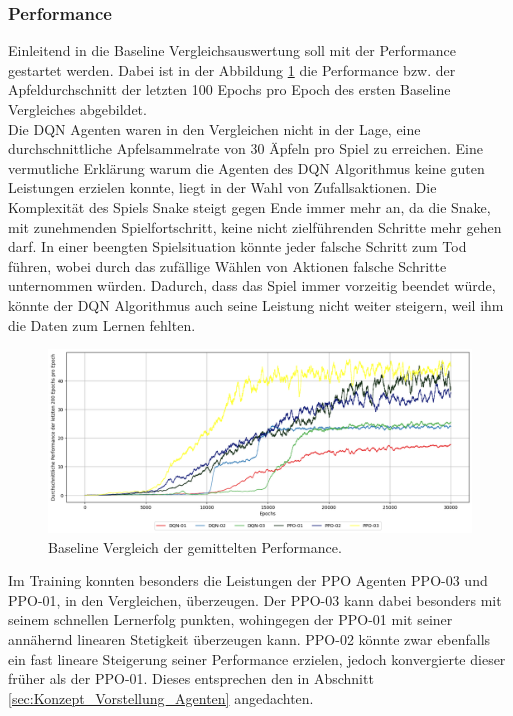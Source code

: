 \subsubsection{Performance}
Einleitend in die Baseline Vergleichsauswertung soll mit der Performance gestartet werden. Dabei ist in der Abbildung \ref{fig:Baseline_01_performance} die Performance bzw. der Apfeldurchschnitt der letzten 100 Epochs pro Epoch des ersten Baseline Vergleiches abgebildet.\\
Die DQN Agenten waren in den Vergleichen nicht in der Lage, eine durchschnittliche Apfelsammelrate von 30 Äpfeln pro Spiel zu erreichen. 
Eine vermutliche Erklärung warum die Agenten des DQN Algorithmus keine guten Leistungen erzielen konnte, liegt in der Wahl von Zufallsaktionen. Die Komplexität des Spiels Snake steigt gegen Ende immer mehr an, da die Snake, mit zunehmenden Spielfortschritt, keine nicht zielführenden Schritte mehr gehen darf. In einer beengten Spielsituation könnte jeder falsche Schritt zum Tod führen, wobei durch das zufällige Wählen von Aktionen falsche Schritte unternommen würden. Dadurch, dass das Spiel immer vorzeitig beendet würde, könnte der DQN Algorithmus auch seine Leistung nicht weiter steigern, weil ihm die Daten zum Lernen fehlten.
\begin{figure}[H]
	\centering
	\includegraphics[scale=0.4517]{Abbildungen/Evaluation/baseline-performance.png}
	\caption[Baseline Vergleich Performance]{Baseline Vergleich der gemittelten Performance.}
	\label{fig:Baseline_01_performance}
\end{figure}
Im Training konnten besonders die Leistungen der PPO Agenten PPO-03 und PPO-01, in den Vergleichen, überzeugen. 
Der PPO-03 kann dabei besonders mit seinem schnellen Lernerfolg punkten, wohingegen der PPO-01 mit seiner annähernd linearen Stetigkeit überzeugen kann.
PPO-02 könnte zwar ebenfalls ein fast lineare Steigerung seiner Performance erzielen, jedoch konvergierte dieser früher als der PPO-01.
Dieses entsprechen den in Abschnitt \ref{sec:Konzept_Vorstellung_Agenten} angedachten.
